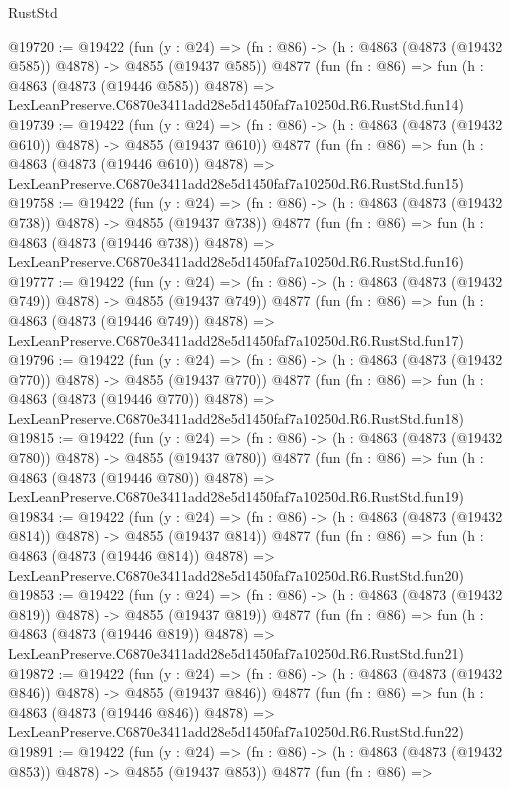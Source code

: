 \begin{lexlean}{RustStd}
\begin{coremodule}
@19720 := @19422
    (fun (y : @24) => (fn : @86) -> (h : @4863 (@4873 (@19432 @585)) @4878) -> @4855 (@19437 @585))
    @4877
    (fun (fn : @86) =>
    fun (h : @4863 (@4873 (@19446 @585)) @4878) =>
    LexLeanPreserve.C6870e3411add28e5d1450faf7a10250d.R6.RustStd.fun14)
@19739 := @19422
    (fun (y : @24) => (fn : @86) -> (h : @4863 (@4873 (@19432 @610)) @4878) -> @4855 (@19437 @610))
    @4877
    (fun (fn : @86) =>
    fun (h : @4863 (@4873 (@19446 @610)) @4878) =>
    LexLeanPreserve.C6870e3411add28e5d1450faf7a10250d.R6.RustStd.fun15)
@19758 := @19422
    (fun (y : @24) => (fn : @86) -> (h : @4863 (@4873 (@19432 @738)) @4878) -> @4855 (@19437 @738))
    @4877
    (fun (fn : @86) =>
    fun (h : @4863 (@4873 (@19446 @738)) @4878) =>
    LexLeanPreserve.C6870e3411add28e5d1450faf7a10250d.R6.RustStd.fun16)
@19777 := @19422
    (fun (y : @24) => (fn : @86) -> (h : @4863 (@4873 (@19432 @749)) @4878) -> @4855 (@19437 @749))
    @4877
    (fun (fn : @86) =>
    fun (h : @4863 (@4873 (@19446 @749)) @4878) =>
    LexLeanPreserve.C6870e3411add28e5d1450faf7a10250d.R6.RustStd.fun17)
@19796 := @19422
    (fun (y : @24) => (fn : @86) -> (h : @4863 (@4873 (@19432 @770)) @4878) -> @4855 (@19437 @770))
    @4877
    (fun (fn : @86) =>
    fun (h : @4863 (@4873 (@19446 @770)) @4878) =>
    LexLeanPreserve.C6870e3411add28e5d1450faf7a10250d.R6.RustStd.fun18)
@19815 := @19422
    (fun (y : @24) => (fn : @86) -> (h : @4863 (@4873 (@19432 @780)) @4878) -> @4855 (@19437 @780))
    @4877
    (fun (fn : @86) =>
    fun (h : @4863 (@4873 (@19446 @780)) @4878) =>
    LexLeanPreserve.C6870e3411add28e5d1450faf7a10250d.R6.RustStd.fun19)
@19834 := @19422
    (fun (y : @24) => (fn : @86) -> (h : @4863 (@4873 (@19432 @814)) @4878) -> @4855 (@19437 @814))
    @4877
    (fun (fn : @86) =>
    fun (h : @4863 (@4873 (@19446 @814)) @4878) =>
    LexLeanPreserve.C6870e3411add28e5d1450faf7a10250d.R6.RustStd.fun20)
@19853 := @19422
    (fun (y : @24) => (fn : @86) -> (h : @4863 (@4873 (@19432 @819)) @4878) -> @4855 (@19437 @819))
    @4877
    (fun (fn : @86) =>
    fun (h : @4863 (@4873 (@19446 @819)) @4878) =>
    LexLeanPreserve.C6870e3411add28e5d1450faf7a10250d.R6.RustStd.fun21)
@19872 := @19422
    (fun (y : @24) => (fn : @86) -> (h : @4863 (@4873 (@19432 @846)) @4878) -> @4855 (@19437 @846))
    @4877
    (fun (fn : @86) =>
    fun (h : @4863 (@4873 (@19446 @846)) @4878) =>
    LexLeanPreserve.C6870e3411add28e5d1450faf7a10250d.R6.RustStd.fun22)
@19891 := @19422
    (fun (y : @24) => (fn : @86) -> (h : @4863 (@4873 (@19432 @853)) @4878) -> @4855 (@19437 @853))
    @4877
    (fun (fn : @86) =>

\end{coremodule}
\end{lexlean}
